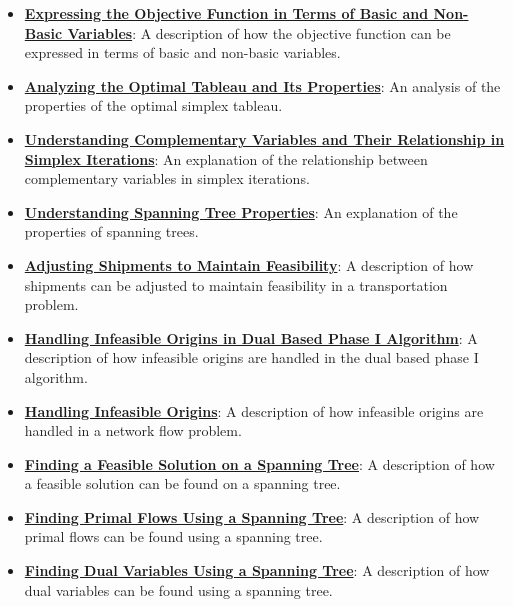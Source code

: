 \documentclass{article}%
\begin{document}
\begin{itemize}[leftmargin=*]
\item \href{https://www.math.purdue.edu/~yipn/421/2024-12-03-Duality.pdf#page=1}{\textbf{Expressing the Objective Function in Terms of Basic and Non{-}Basic Variables}}: A description of how the objective function can be expressed in terms of basic and non-basic variables. %
\item \href{https://www.math.purdue.edu/~yipn/421/2024-12-03-Duality.pdf#page=1}{\textbf{Analyzing the Optimal Tableau and Its Properties}}: An analysis of the properties of the optimal simplex tableau. %
\item \href{https://www.math.purdue.edu/~yipn/421/2024-12-03-Duality.pdf#page=1}{\textbf{Understanding Complementary Variables and Their Relationship in Simplex Iterations}}: An explanation of the relationship between complementary variables in simplex iterations. %
\item \href{https://www.math.purdue.edu/~yipn/421/2024-12-03-Duality.pdf#page=1}{\textbf{Understanding Spanning Tree Properties}}: An explanation of the properties of spanning trees. %
\item \href{https://www.math.purdue.edu/~yipn/421/2024-12-03-Duality.pdf#page=1}{\textbf{Adjusting Shipments to Maintain Feasibility}}: A description of how shipments can be adjusted to maintain feasibility in a transportation problem. %
\item \href{https://www.math.purdue.edu/~yipn/421/2024-12-03-Duality.pdf#page=1}{\textbf{Handling Infeasible Origins in Dual Based Phase I Algorithm}}: A description of how infeasible origins are handled in the dual based phase I algorithm. %
\item \href{https://www.math.purdue.edu/~yipn/421/2024-12-03-Duality.pdf#page=1}{\textbf{Handling Infeasible Origins}}: A description of how infeasible origins are handled in a network flow problem. %
\item \href{https://www.math.purdue.edu/~yipn/421/2024-12-03-Duality.pdf#page=1}{\textbf{Finding a Feasible Solution on a Spanning Tree}}: A description of how a feasible solution can be found on a spanning tree. %
\item \href{https://www.math.purdue.edu/~yipn/421/2024-12-03-Duality.pdf#page=1}{\textbf{Finding Primal Flows Using a Spanning Tree}}: A description of how primal flows can be found using a spanning tree. %
\item \href{https://www.math.purdue.edu/~yipn/421/2024-12-03-Duality.pdf#page=1}{\textbf{Finding Dual Variables Using a Spanning Tree}}: A description of how dual variables can be found using a spanning tree. %

\end{itemize}
\end{document}
